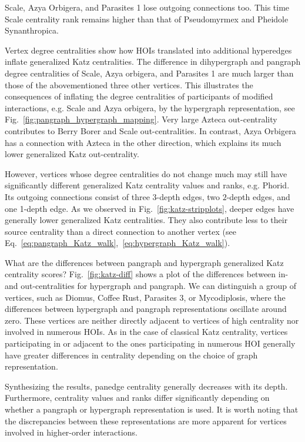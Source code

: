 \documentclass[a4paper,12pt]{article}
\theoremstyle{definition}
\theoremstyle{remark}
\begin{document}
Scale, Azya Orbigera, and Parasites 1 lose outgoing connections too. This time 
Scale centrality rank remains higher than that of Pseudomyrmex and Pheidole Synanthropica. 

Vertex degree centralities show how HOIs translated into additional hyperedges inflate generalized Katz centralities. The difference in dihypergraph and pangraph degree centralities of Scale, Azya orbigera, and Parasites 1 are much larger than those of the abovementioned three other vertices. This illustrates the consequences of inflating the degree centralities of participants of modified interactions, e.g. Scale and Azya orbigera, by the hypergraph representation, see Fig.~\ref{fig:pangraph_hypergraph_mapping}. Very large Azteca out-centrality contributes to Berry Borer and Scale out-centralities. In contrast, Azya Orbigera has a connection with Azteca in the other direction, which explains its much lower generalized Katz out-centrality.

However, vertices whose degree centralities do not change much may still have significantly different generalized Katz centrality values and ranks, e.g. Phorid. Its outgoing connections consist of three $3$-depth edges, two $2$-depth edges, and one 1-depth edge. As we observed in Fig.~\ref{fig:katz-stripplots}, deeper edges have generally lower generalized Katz centralities. They also contribute less to their source centrality than a direct connection to another vertex (see Eq.~\ref{eq:pangraph_Katz_walk},~\ref{eq:hypergraph_Katz_walk}).

What are the differences between pangraph and hypergraph generalized Katz centrality scores? Fig.~\ref{fig:katz-diff} shows a plot of the differences between in- and out-centralities for hypergraph and pangraph. We can distinguish a group of vertices, such as Diomus, Coffee Rust, Parasites 3, or Mycodiplosis, where the differences between hypergraph and pangraph representations oscillate around zero. These vertices are neither directly adjacent to vertices of high centrality nor involved in numerous HOIs. As in the case of classical Katz centrality, vertices participating in or adjacent to the ones participating in numerous HOI generally have greater differences in centrality depending on the choice of graph representation.

Synthesizing the results, panedge centrality generally decreases with its depth. Furthermore, centrality values and ranks differ significantly depending on whether a pangraph or hypergraph representation is used. It is worth noting that the discrepancies between these representations are more apparent for vertices involved in higher-order interactions.
\end{document}
